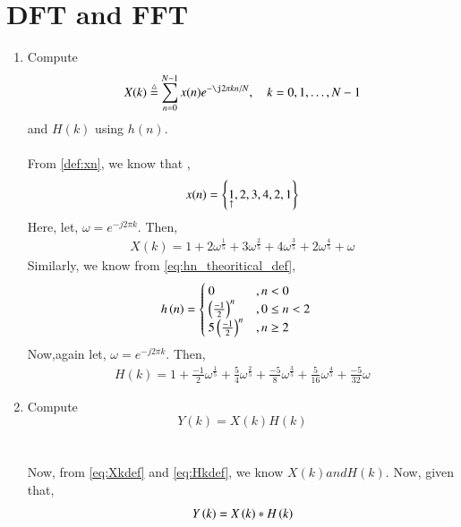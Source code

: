 \documentclass[journal,12pt,twocolumn]{IEEEtran}
\renewcommand\thesection{\arabic{section}}
\begin{document}
\section{DFT and FFT}
\begin{enumerate}[label=\thesection.\arabic*]
\item
Compute
\begin{equation}
X(k) \define \sum _{n=0}^{N-1}x(n) e^{-\j2\pi kn/N}, \quad k = 0,1,\dots, N-1
\end{equation}
and $H(k)$ using $h(n)$.
\\\solution\\
From \ref{def:xn}, we know that ,
\begin{equation}
	x(n) = \left\{\underset{\uparrow}{1},2,3,4,2,1\right\}
\end{equation}
Here, let, $\omega=e^{-j2\pi k}$. Then,
\begin{align}
	X(k)=1+2\omega^{\frac{1}{5}}+3\omega^{\frac{2}{5}}+4\omega^{\frac{3}{5}}+2\omega^{\frac{4}{5}}+\omega
	\label{eq:Xkdef}
\end{align}
Similarly, we know from \eqref{eq:hn_theoritical_def},
\begin{align}
	h\left(n\right) &= \begin{cases}
					 0 &, n < 0\\
					 \left(\frac{-1}{2}\right)^n &, 0\leq n<2\\
					 5\left(\frac{-1}{2}\right)^n &, n \geq 2
				  \end{cases}
\end{align}
Now,again let, $\omega=e^{-j2\pi k}$. Then,
\begin{align}
	H(k)=1+\frac{-1}{2}\omega^{\frac{1}{5}}+\frac{5}{4}\omega^{\frac{2}{5}}+\frac{-5}{8}\omega^{\frac{3}{5}}+\frac{5}{16}\omega^{\frac{4}{5}}+\frac{-5}{32}\omega
	\label{eq:Hkdef}
\end{align}
\item Compute 
\begin{equation}
Y(k) = X(k)H(k)
\end{equation}
\\\solution
\\Now, from \eqref{eq:Xkdef} and \eqref{eq:Hkdef}, we know $X(k) and H(k)$. Now, given that,
\begin{equation}
	Y\left(k\right)=X\left(k\right)*H\left(k\right)
\end{equation}

\end{enumerate}
\end{document}
